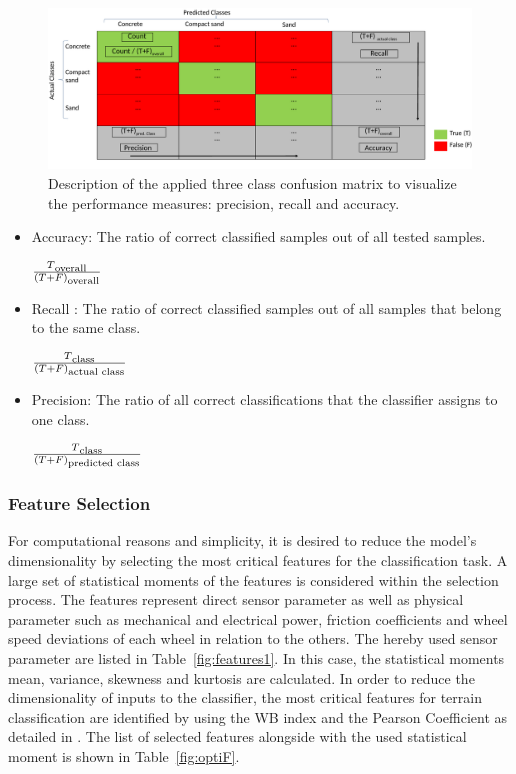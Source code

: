 \documentclass{article}
\begin{document}
\begin{figure}[!htb]
\centering
\includegraphics[width=\textwidth]{../figures/CM_Description.pdf}
\caption{\label{fig:CMdescrpit}Description of the applied three class confusion matrix to visualize the performance measures: precision, recall and accuracy.\cite{kuhr2021}}
\end{figure}
\begin{itemize}
\item Accuracy: The ratio of correct classified samples out of all tested samples. 

$\frac{T\textsubscript{overall}}{(T+F)\textsubscript{overall}}$

\item Recall : The ratio of correct classified samples out of all samples that belong to the same class.

$\frac{T\textsubscript{class}}{(T+F)\textsubscript{actual class}}$

\item Precision: The ratio of all correct classifications that the classifier assigns to one class.

$\frac{T\textsubscript{class}}{(T+F)\textsubscript{predicted class}}$

\end{itemize}

\subsubsection{Feature Selection}
For computational reasons and simplicity, it is desired to reduce the model's dimensionality by selecting the most critical features for the  classification task. A large set of statistical moments of the features is considered within the selection process. The features represent direct sensor parameter as well as physical parameter such as mechanical and electrical power, friction coefficients and wheel speed deviations of each wheel in relation to the others. The hereby used sensor parameter are listed in Table~\ref{fig:features1}. In this case, the statistical moments mean, variance, skewness and kurtosis are calculated. In order to reduce the dimensionality of inputs to the classifier, the most critical features for terrain classification are identified by using the WB index and the Pearson Coefficient as detailed in \cite{Dimastrogiovanni2020}. 
The list of selected features alongside with the used statistical moment is shown in Table~\ref{fig:optiF}. 
\end{document}
